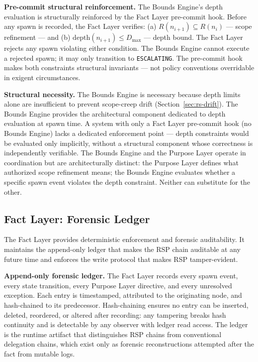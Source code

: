 \medskip
\noindent\textbf{Pre-commit structural reinforcement.} The Bounds Engine's depth evaluation is structurally reinforced by the Fact Layer pre-commit hook. Before any spawn is recorded, the Fact Layer verifies: (a) $R(n_{i+1}) \subseteq R(n_i)$ — scope refinement — and (b) $\mathrm{depth}(n_{i+1}) \leq D_{\mathrm{max}}$ — depth bound. The Fact Layer rejects any spawn violating either condition. The Bounds Engine cannot execute a rejected spawn; it may only transition to \texttt{ESCALATING}. The pre-commit hook makes both constraints structural invariants — not policy conventions overridable in exigent circumstances.

\medskip
\noindent\textbf{Structural necessity.} The Bounds Engine is necessary because depth limits alone are insufficient to prevent scope-creep drift (Section~\ref{sec:rs-drift}). The Bounds Engine provides the architectural component dedicated to depth evaluation at spawn time. A system with only a Fact Layer pre-commit hook (no Bounds Engine) lacks a dedicated enforcement point — depth constraints would be evaluated only implicitly, without a structural component whose correctness is independently verifiable. The Bounds Engine and the Purpose Layer operate in coordination but are architecturally distinct: the Purpose Layer defines what authorized scope refinement means; the Bounds Engine evaluates whether a specific spawn event violates the depth constraint. Neither can substitute for the other.

\subsection{Fact Layer: Forensic Ledger}
\label{sec:rs-fact-ledger}

The Fact Layer provides deterministic enforcement and forensic auditability. It maintains the append-only ledger that makes the RSP chain auditable at any future time and enforces the write protocol that makes RSP tamper-evident.

\medskip
\noindent\textbf{Append-only forensic ledger.} The Fact Layer records every spawn event, every state transition, every Purpose Layer directive, and every unresolved exception. Each entry is timestamped, attributed to the originating node, and hash-chained to its predecessor. Hash-chaining ensures no entry can be inserted, deleted, reordered, or altered after recording: any tampering breaks hash continuity and is detectable by any observer with ledger read access. The ledger is the runtime artifact that distinguishes RSP chains from conventional delegation chains, which exist only as forensic reconstructions attempted after the fact from mutable logs.

